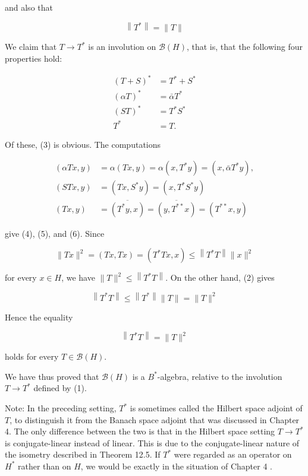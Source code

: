 \documentclass[10pt]{article}
\begin{document}
and also that

$$
\left\|T^{*}\right\|=\|T\|
$$

We claim that $T \rightarrow T^{*}$ is an involution on $\mathscr{B}(H)$, that is, that the following four properties hold:

$$
\begin{aligned}
(T+S)^{*} & =T^{*}+S^{*} \\
(\alpha T)^{*} & =\bar{\alpha} T^{*} \\
(S T)^{*} & =T^{*} S^{*} \\
T^{*} & =T .
\end{aligned}
$$

Of these, (3) is obvious. The computations

$$
\begin{aligned}
(\alpha T x, y) & =\alpha(T x, y)=\alpha\left(x, T^{*} y\right)=\left(x, \bar{\alpha} T^{*} y\right), \\
(S T x, y) & =\left(T x, S^{*} y\right)=\left(x, T^{*} S^{*} y\right) \\
(T x, y) & =\overline{\left(T^{*} y, x\right)}=\overline{\left(y, T^{* *} x\right)}=\left(T^{* *} x, y\right)
\end{aligned}
$$

give (4), (5), and (6). Since

$$
\|T x\|^{2}=(T x, T x)=\left(T^{*} T x, x\right) \leq\left\|T^{*} T\right\|\|x\|^{2}
$$

for every $x \in H$, we have $\|T\|^{2} \leq\left\|T^{*} T\right\|$. On the other hand, (2) gives

$$
\left\|T^{*} T\right\| \leq\left\|T^{*}\right\|\|T\|=\|T\|^{2}
$$

Hence the equality

$$
\left\|T^{*} T\right\|=\|T\|^{2}
$$

holds for every $T \in \mathscr{B}(H)$.

We have thus proved that $\mathscr{B}(H)$ is a $B^{*}$-algebra, relative to the involution $T \rightarrow T^{*}$ defined by (1).

Note: In the preceding setting, $T^{*}$ is sometimes called the Hilbert space adjoint of $T$, to distinguish it from the Banach space adjoint that was discussed in Chapter 4. The only difference between the two is that in the Hilbert space setting $T \rightarrow T^{*}$ is conjugate-linear instead of linear. This is due to the conjugate-linear nature of the isometry described in Theorem 12.5. If $T^{*}$ were regarded as an operator on $H^{*}$ rather than on $H$, we would be exactly in the situation of Chapter 4 .
\end{document}
